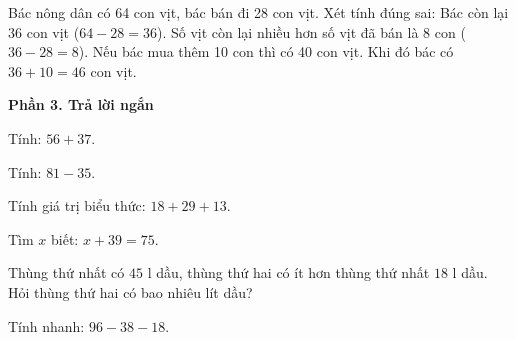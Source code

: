 \begin{ex} %
Bác nông dân có 64 con vịt, bác bán đi 28 con vịt. Xét tính đúng sai:
\choiceTF
{\True Bác còn lại 36 con vịt ($64 - 28 = 36$).}
{\True Số vịt còn lại nhiều hơn số vịt đã bán là 8 con ($36 - 28 = 8$).}
{Nếu bác mua thêm 10 con thì có 40 con vịt.}
{\True Khi đó bác có $36 + 10 = 46$ con vịt.}
\end{ex}

\textbf{Phần 3. Trả lời ngắn}

\begin{ex} %
Tính: $56 + 37$.
\end{ex}

\begin{ex} %
Tính: $81 - 35$.
\end{ex}

\begin{ex} %
Tính giá trị biểu thức: $18 + 29 + 13$.
\end{ex}

\begin{ex} %
Tìm $x$ biết: $x + 39 = 75$.
\end{ex}

\begin{ex} %
Thùng thứ nhất có $45\text{ l}$ dầu, thùng thứ hai có ít hơn thùng thứ nhất $18\text{ l}$ dầu. Hỏi thùng thứ hai có bao nhiêu lít dầu?
\end{ex}

\begin{ex} %
Tính nhanh: $96 - 38 - 18$.
\end{ex}
